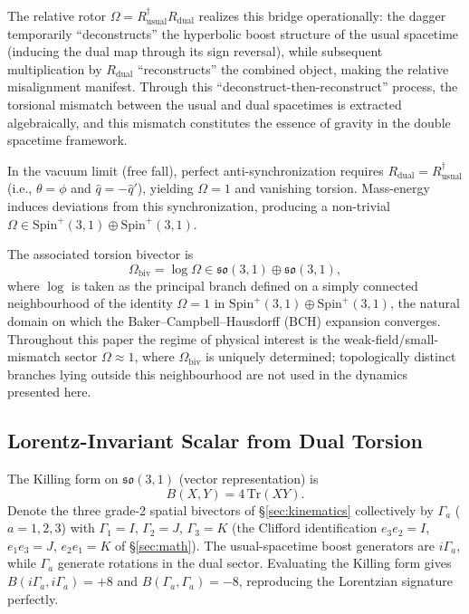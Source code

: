\documentclass[dvipdfmx,a4paper]{article}
\begin{document}
The relative rotor $\Omega = R_\text{usual}^\dagger R_\text{dual}$ realizes this bridge operationally: the dagger temporarily ``deconstructs'' the hyperbolic boost structure of the usual spacetime (inducing the dual map through its sign reversal), while subsequent multiplication by $R_\text{dual}$ ``reconstructs'' the combined object, making the relative misalignment manifest. Through this ``deconstruct-then-reconstruct'' process, the torsional mismatch between the usual and dual spacetimes is extracted algebraically, and this mismatch constitutes the essence of gravity in the double spacetime framework.

In the vacuum limit (free fall), perfect anti-synchronization requires $R_\text{dual} = R_\text{usual}^\dagger$ (i.e., $\theta = \phi$ and $\hat{q} = -\hat{q}'$), yielding $\Omega = 1$ and vanishing torsion. Mass-energy induces deviations from this synchronization, producing a non-trivial $\Omega \in \mathrm{Spin}^+(3,1) \oplus \mathrm{Spin}^+(3,1)$.

The associated torsion bivector is
\[
\Omega_\text{biv} = \log \Omega \in \mathfrak{so}(3,1) \oplus \mathfrak{so}(3,1),
\]
where $\log$ is taken as the principal branch defined on a simply connected neighbourhood of the identity $\Omega = 1$ in $\mathrm{Spin}^+(3,1) \oplus \mathrm{Spin}^+(3,1)$, the natural domain on which the Baker--Campbell--Hausdorff (BCH) expansion converges. Throughout this paper the regime of physical interest is the weak-field/small-mismatch sector $\Omega \approx 1$, where $\Omega_\text{biv}$ is uniquely determined; topologically distinct branches lying outside this neighbourhood are not used in the dynamics presented here.

\subsection{Lorentz-Invariant Scalar from Dual Torsion}

The Killing form on $\mathfrak{so}(3,1)$ (vector representation) is
\[
B(X,Y) = 4\,\mathrm{Tr}(X Y).
\]
Denote the three grade-2 spatial bivectors of \S\ref{sec:kinematics} collectively by $\Gamma_a$ ($a=1,2,3$) with $\Gamma_1 = I$, $\Gamma_2 = J$, $\Gamma_3 = K$ (the Clifford identification $e_3e_2 = I$, $e_1e_3 = J$, $e_2e_1 = K$ of \S\ref{sec:math}). The usual-spacetime boost generators are $i\Gamma_a$, while $\Gamma_a$ generate rotations in the dual sector. Evaluating the Killing form gives $B(i\Gamma_a, i\Gamma_a) = +8$ and $B(\Gamma_a, \Gamma_a) = -8$, reproducing the Lorentzian signature perfectly.
\end{document}
